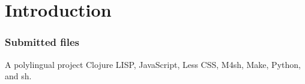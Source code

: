 \chapter{Introduction}\label{chap:introduction}









\subsection*{Submitted files}

A polylingual project Clojure LISP, JavaScript, Less CSS, M4sh, Make,
Python, and sh.

